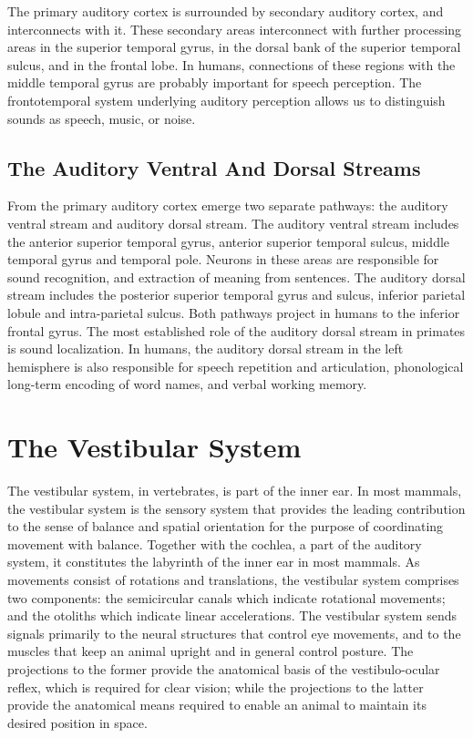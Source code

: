 The primary auditory cortex is surrounded by secondary auditory cortex, and interconnects with it. These secondary areas interconnect with further processing areas in the superior temporal gyrus, in the dorsal bank of the superior temporal sulcus, and in the frontal lobe. In humans, connections of these regions with the middle temporal gyrus are probably important for speech perception. The frontotemporal system underlying auditory perception allows us to distinguish sounds as speech, music, or noise.

\hypertarget{the-auditory-ventral-and-dorsal-streams}{%
\subsection{The Auditory Ventral And Dorsal Streams}\label{the-auditory-ventral-and-dorsal-streams}}

From the primary auditory cortex emerge two separate pathways: the auditory ventral stream and auditory dorsal stream. The auditory ventral stream includes the anterior superior temporal gyrus, anterior superior temporal sulcus, middle temporal gyrus and temporal pole. Neurons in these areas are responsible for sound recognition, and extraction of meaning from sentences. The auditory dorsal stream includes the posterior superior temporal gyrus and sulcus, inferior parietal lobule and intra-parietal sulcus. Both pathways project in humans to the inferior frontal gyrus. The most established role of the auditory dorsal stream in primates is sound localization. In humans, the auditory dorsal stream in the left hemisphere is also responsible for speech repetition and articulation, phonological long-term encoding of word names, and verbal working memory.

\hypertarget{the-vestibular-system}{%
\section{The Vestibular System}\label{the-vestibular-system}}

The vestibular system, in vertebrates, is part of the inner ear. In most mammals, the vestibular system is the sensory system that provides the leading contribution to the sense of balance and spatial orientation for the purpose of coordinating movement with balance. Together with the cochlea, a part of the auditory system, it constitutes the labyrinth of the inner ear in most mammals. As movements consist of rotations and translations, the vestibular system comprises two components: the semicircular canals which indicate rotational movements; and the otoliths which indicate linear accelerations. The vestibular system sends signals primarily to the neural structures that control eye movements, and to the muscles that keep an animal upright and in general control posture. The projections to the former provide the anatomical basis of the vestibulo-ocular reflex, which is required for clear vision; while the projections to the latter provide the anatomical means required to enable an animal to maintain its desired position in space.

